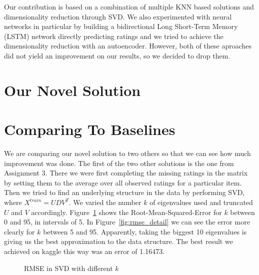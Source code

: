 \documentclass[10pt,conference,compsocconf]{IEEEtran}
\newcommand{\rfig}[1]{Figure~\ref{fig:#1}}
\begin{document}
Our contribution is based on a combination of multiple KNN based solutions and dimensionality reduction through SVD. We also experimented with neural networks in particular by building a bidirectional Long Short-Term Memory (LSTM) network directly predicting ratings and we tried to achieve the dimensionality reduction with an autoencoder. However, both of these aproaches did not yield an improvement on our results, so we decided to drop them.
\section{Our Novel Solution}

\section{Comparing To Baselines}
We are comparing our novel solution to two others so that we can see how much improvement was done. The first of the two other solutions is the one from Assignment 3. There we were first completing the missing ratings in the matrix by setting them to the average over all observed ratings for a particular item. Then we tried to find an underlying structure in the data by performing SVD, where $X^{train} = UDV^T$. We varied the number $k$ of eigenvalues used and truncated $U$ and $V$ accordingly. \rfig{rmse} shows the Root-Mean-Squared-Error for $k$ between 0 and 95, in intervals of 5. In \rfig{rmse_detail} we can see the error more clearly for $k$ between 5 and 95. Apparently, taking the biggest 10 eigenvalues is giving us the best approximation to the data structure. The best result we achieved on kaggle this way was an error of 1.16473.

\begin{figure}[bp]
\centering
{}
\caption{RMSE in SVD with different $k$}
\label{fig:rmse}
\end{figure}
\end{document}
